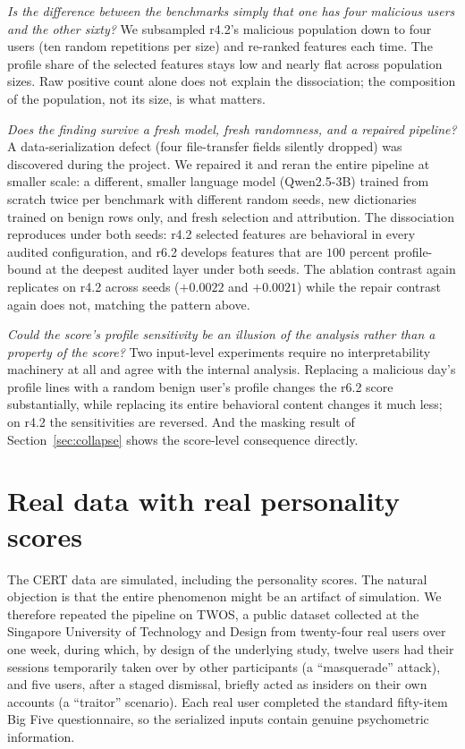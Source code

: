 \documentclass[10pt]{article}
\begin{document}
\emph{Is the difference between the benchmarks simply that one has four
malicious users and the other sixty?} We subsampled r4.2's malicious
population down to four users (ten random repetitions per size) and
re-ranked features each time. The profile share of the selected
features stays low and nearly flat across population sizes. Raw
positive count alone does not explain the dissociation; the composition
of the population, not its size, is what matters.

\emph{Does the finding survive a fresh model, fresh randomness, and a
repaired pipeline?} A data-serialization defect (four file-transfer
fields silently dropped) was discovered during the project. We repaired
it and reran the entire pipeline at smaller scale: a different, smaller
language model (Qwen2.5-3B) trained from scratch twice per benchmark
with different random seeds, new dictionaries trained on benign rows
only, and fresh selection and attribution. The dissociation reproduces
under both seeds: r4.2 selected features are behavioral in every
audited configuration, and r6.2 develops features that are $100$
percent profile-bound at the deepest audited layer under both seeds.
The ablation contrast again replicates on r4.2 across seeds
($+0.0022$ and $+0.0021$) while the repair contrast again does not,
matching the pattern above.

\emph{Could the score's profile sensitivity be an illusion of the
analysis rather than a property of the score?} Two input-level
experiments require no interpretability machinery at all and agree with
the internal analysis. Replacing a malicious day's profile lines with a
random benign user's profile changes the r6.2 score substantially,
while replacing its entire behavioral content changes it much less; on
r4.2 the sensitivities are reversed. And the masking result of
Section~\ref{sec:collapse} shows the score-level consequence directly.

\section{Real data with real personality scores}
\label{sec:twos}

The CERT data are simulated, including the personality scores. The
natural objection is that the entire phenomenon might be an artifact of
simulation. We therefore repeated the pipeline on TWOS, a public
dataset collected at the Singapore University of Technology and Design
from twenty-four real users over one week, during which, by design of
the underlying study, twelve users had their sessions temporarily taken
over by other participants (a ``masquerade'' attack), and five users,
after a staged dismissal, briefly acted as insiders on their own accounts
(a ``traitor'' scenario). Each real user
completed the standard fifty-item Big Five questionnaire, so the
serialized inputs contain genuine psychometric information.
\end{document}
